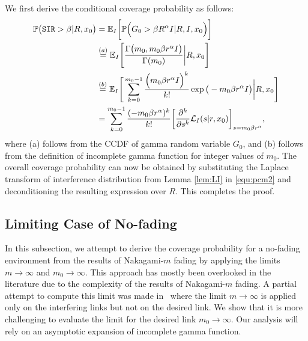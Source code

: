 \documentclass[journal,draftclsnofoot,onecolumn,12pt]{IEEEtran}
\begin{document}
\begin{IEEEproof}
We first derive the conditional coverage probability as follows:
\begin{align} \notag
\mathbb{P}\big( \mathtt{SIR} > \beta | R, x_0\big) &= {\mathbb{E}}_I \bigg[\mathbb{P}\Big( G_0 > \beta R^{\alpha} I | R, I, x_0 \Big) \bigg] \\ \notag
&\stackrel{(a)}{=} {\mathbb{E}}_I \Bigg[ \frac{\Gamma\big(m_0, m_0 \beta r^{\alpha} I \big)}{\Gamma(m_0)}\bigg| R, x_0 \Bigg]\\ \notag
&\stackrel{(b)}{=} {\mathbb{E}}_I \Bigg[ \sum_{k=0}^{m_0-1} \frac{\Big(m_0 \beta r^{\alpha} I \Big)^k}{k!} \exp\big(-m_0 \beta r^{\alpha} I\big) \bigg| R, x_0\Bigg] \\ \label{equ:pcm2}
&= \sum_{k=0}^{m_0-1} \frac{(-m_0 \beta r^{\alpha})^k}{k!} \bigg[ \frac{\partial^k}{\partial s^k} \mathcal{L}_I(s| r, x_0) \bigg]_{s=m_0 \beta r^{\alpha}},
\end{align}
where (a) follows from the CCDF of gamma random variable $G_0$, and (b) follows from the definition of incomplete gamma function for integer values of $m_0$. The overall coverage probability can now be obtained by substituting the Laplace transform of interference distribution from Lemma \ref{lem:LI} in \eqref{equ:pcm2} and deconditioning the resulting expression over $R$. This completes the proof.
\end{IEEEproof}

\subsection{Limiting Case of No-fading
}
In this subsection, we attempt to derive the coverage probability for a no-fading environment from the results of Nakagami-$m$ fading by applying the limits $m \to \infty$ and $m_0 \to \infty$. This approach has mostly been overlooked in the literature due to the complexity of the results of Nakagami-$m$ fading. A partial attempt to compute this limit was made in~\cite{ralph} where the limit $m \to\infty$ is applied only on the interfering links but not on the desired link. We show that it is more challenging to evaluate the limit for the desired link $m_0 \to \infty$. Our analysis will rely on an asymptotic expansion of incomplete gamma function.
\end{document}
